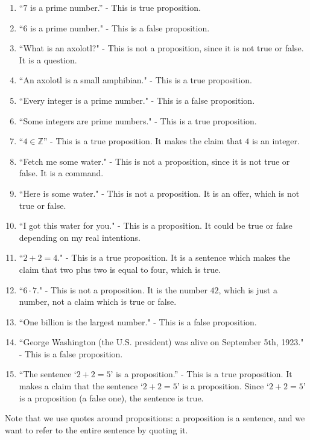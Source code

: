 \begin{solutions}
		\begin{enumerate}
	\item ``$7$ is a prime number.'' -  This is true proposition.
	\item ``$6$ is a prime number." -  This is a false proposition.
	\item ``What is an axolotl?" - This is not a proposition, since it is not true or false.  It is a question.
	\item ``An axolotl is a small amphibian." -  This is a true proposition.
	\item ``Every integer is a prime number." -  This is a false proposition.
	\item ``Some integers are prime numbers." - This is a true proposition.
	\item  ``$4 \in \mathbb{Z}$'' - This is a true proposition.  It makes the claim that $4$ is an integer.
	\item ``Fetch me some water." -  This is not a proposition, since it is not true or false.  It is a command.
	\item ``Here is some water." -  This is not a proposition.  It is an offer, which is not true or false.
	\item ``I got this water for you." -  This is a proposition.  It could be true or false depending on my real intentions.
	\item ``$2+2 = 4$." -  This is a true proposition.  It is a sentence which makes the claim that two plus two is equal to four, which is true.
	\item ``$6 \cdot 7$." -  This is not a proposition.  It is the number $42$, which is just a number, not a claim which is true or false.
	\item ``One billion is the largest number." -  This is a false proposition.
	\item ``George Washington (the U.S. president) was alive on September 5th, 1923." -  This is a false proposition.
	\item ``The sentence `$2+2 = 5$' is a proposition.'' - This is a true proposition.  It makes a claim that the sentence `$2+2 = 5$' is a proposition.  Since `$2+2 = 5$' is a proposition (a false one), the sentence is true.
\end{enumerate}
	\end{solutions}

Note that we use quotes around propositions:  a proposition is a sentence, and we want to refer to the entire sentence by quoting it. 

